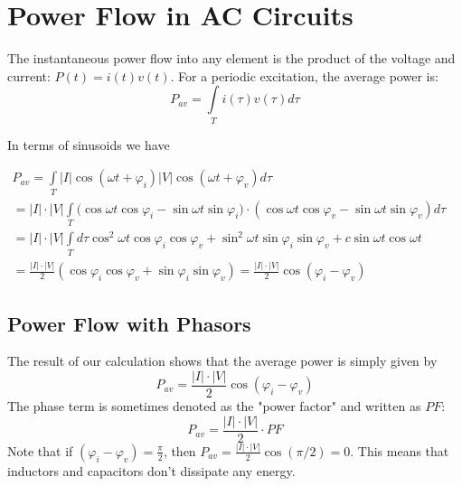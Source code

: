 \section{Power Flow in AC Circuits}








 The instantaneous power flow into any element is the product of the voltage and current: $P(t) = i(t)v(t)$.  For a periodic excitation, the average power is:
\begin{equation} 
{P_{av}} = \int\limits_T {i(\tau )v(\tau )d\tau } 
\end{equation}

In terms of sinusoids we have
 
{ \small
$\begin{array}{l}
{P_{av}} = \int\limits_T {\left| I \right|\cos (\omega t + {\varphi _i})\left| V \right|\cos (\omega t + {\varphi _v})d\tau } \\
 = \left| I \right| \cdot \left| V \right|\int\limits_T {(\cos \omega t\cos {\varphi _i} - \sin \omega t\sin {\varphi _i}} ) \cdot (\cos \omega t\cos {\varphi _v} - \sin \omega t\sin {\varphi _v})d\tau \\
 = \left| I \right| \cdot \left| V \right|\int\limits_T {d\tau {{\cos }^2}\omega t\cos {\varphi _i}\cos {\varphi _v} + {{\sin }^2}\omega t\sin {\varphi _i}\sin {\varphi _v} + c\sin \omega t\cos \omega t} \\
 = \frac{{\left| I \right| \cdot \left| V \right|}}{2}(\cos {\varphi _i}\cos {\varphi _v} + \sin {\varphi _i}\sin {\varphi _v}) = \frac{{\left| I \right| \cdot \left| V \right|}}{2}\cos ({\varphi _i} - {\varphi _v})
\end{array}$
}



\subsection{Power Flow with Phasors}

The result of our calculation shows that the average power is simply given by
\begin{equation}
	{P_{av}} = \frac{{\left| I \right| \cdot \left| V \right|}}{2}\cos ({\varphi _i} - {\varphi _v})
\end{equation}
The phase term is sometimes denoted as the "power factor" and written as $PF$:
\begin{equation} 
	{P_{av}} = \frac{{\left| I \right| \cdot \left| V \right|}}{2} \cdot PF
\end{equation}
Note that if $({\varphi _i} - {\varphi _v}) = \frac{\pi }{2}$, then ${P_{av}} = \frac{{\left| I \right| \cdot \left| V \right|}}{2}\cos (\pi /2) = 0$.  This means that inductors and capacitors don't dissipate any energy.

